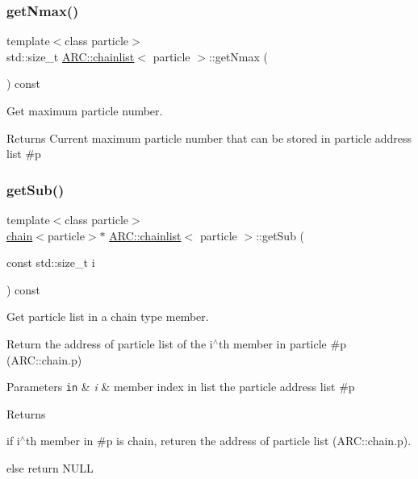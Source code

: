 \subsubsection{\texorpdfstring{get\+Nmax()}{getNmax()}}
{\footnotesize\ttfamily template$<$class particle$>$ \\
std\+::size\+\_\+t \hyperlink{classARC_1_1chainlist}{A\+R\+C\+::chainlist}$<$ particle $>$\+::get\+Nmax (\begin{DoxyParamCaption}{ }\end{DoxyParamCaption}) const\hspace{0.3cm}{\ttfamily [inline]}}



Get maximum particle number. 

\begin{DoxyReturn}{Returns}
Current maximum particle number that can be stored in particle address list \#p 
\end{DoxyReturn}
\hypertarget{classARC_1_1chainlist_a14c6b75c2d3e97cf9babcac2aa014e8a}{}\label{classARC_1_1chainlist_a14c6b75c2d3e97cf9babcac2aa014e8a} 
\subsubsection{\texorpdfstring{get\+Sub()}{getSub()}}
{\footnotesize\ttfamily template$<$class particle$>$ \\
\hyperlink{classARC_1_1chain}{chain}$<$particle$>$$\ast$ \hyperlink{classARC_1_1chainlist}{A\+R\+C\+::chainlist}$<$ particle $>$\+::get\+Sub (\begin{DoxyParamCaption}\item[{const std\+::size\+\_\+t}]{i }\end{DoxyParamCaption}) const\hspace{0.3cm}{\ttfamily [inline]}}



Get particle list in a chain type member. 

Return the address of particle list of the i$^\wedge$th member in particle \#p (A\+R\+C\+::chain.\+p) 
\begin{DoxyParams}[1]{Parameters}
\mbox{\tt in}  & {\em i} & member index in list the particle address list \#p \\
\hline
\end{DoxyParams}
\begin{DoxyReturn}{Returns}

\begin{DoxyItemize}
\item if i$^\wedge$th member in \#p is chain, returen the address of particle list (A\+R\+C\+::chain.\+p).
\item else return N\+U\+LL 
\end{DoxyItemize}
\end{DoxyReturn}
\hypertarget{classARC_1_1chainlist_a84a2c65edf27bd25254e188ebf7d5dce}{}\label{classARC_1_1chainlist_a84a2c65edf27bd25254e188ebf7d5dce} 
